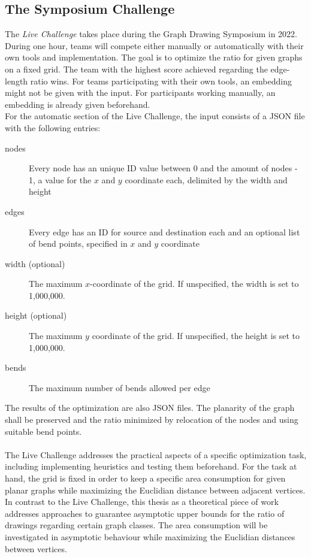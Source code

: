 
\subsection{The Symposium Challenge}

The \emph{Live Challenge} takes place during the Graph Drawing Symposium in 2022. During one hour, teams will compete either manually or automatically with their own tools and implementation. The goal is to optimize the ratio for given graphs on a fixed grid. The team with the highest score achieved regarding the edge-length ratio wins. For teams participating with their own tools, an embedding might not be given with the input. For participants working manually, an embedding is already given beforehand.
\\
For the automatic section of the Live Challenge, the input consists of a JSON file with the following entries:
\begin{description}
	\item[nodes] Every node has an unique ID value between 0 and the amount of nodes - 1, a value for the $x$ and $y$ coordinate each, delimited by the width and height
	\item[edges] Every edge has an ID for source and destination each and an optional list of bend points, specified in $x$ and $y$ coordinate
	\item[width (optional)] The maximum $x$-coordinate of the grid. If unspecified, the width is set to 1,000,000.
	\item[height (optional)] The maximum $y$ coordinate of the grid. If unspecified, the height is set to 1,000,000.
	\item[bends] The maximum number of bends allowed per edge
\end{description}
The results of the optimization are also JSON files. The planarity of the graph shall be preserved and the ratio minimized by relocation of the nodes and using suitable bend points.\\\\
The Live Challenge addresses the practical aspects of a specific optimization task, including implementing heuristics and testing them beforehand. For the task at hand, the grid is fixed in order to keep a specific area consumption for given planar graphs while maximizing the Euclidian distance between adjacent vertices. In contrast to the Live Challenge, this thesis as a theoretical piece of work addresses approaches to guarantee asymptotic upper bounds for the ratio of drawings regarding certain graph classes. The area consumption will be investigated in asymptotic behaviour while maximizing the Euclidian distances between vertices.